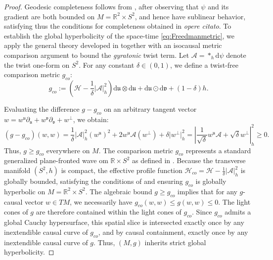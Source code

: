 \documentclass[10pt,a4paper,twoside,reqno]{amsart}
\theoremstyle{plain}
\theoremstyle{definition}
\theoremstyle{remark}
\def\dd{\mathrm{d}}
\def\cH{\mathcal{H}}
\def\cH{\mathcal{H}}
\def\dd{\mathrm{d}}
\def\fru{\mathfrak{u}}
\def\frv{\mathfrak{v}}
\begin{document}
\begin{proof}
Geodesic completeness follows from \cite{Candela:2002rr,Samann:2016svf}, after observing that $\psi$ and its gradient are both bounded on $M = \mathbb{R}^2 \times S^2$, and hence have sublinear behavior, satisfying thus the conditions for completeness obtained in \emph{opere citato}. To establish the global hyperbolicity of the space-time \eqref{eq:Freedmanmetric}, we apply the general theory developed in \cite{Flores:2002fx} together with an isocausal metric comparison argument to bound the \emph{gyratonic} twist term. Let $\mathcal{A} = \ast_h \dd\psi$ denote the twist one-form on $S^2$. For any constant $\delta \in (0,1)$, we define a twist-free comparison metric $g_{co}$:
\begin{equation*}
g_{co} :=  (\cH - \frac{1}{\delta} \vert\mathcal{A}\vert^2_h ) \dd\fru \otimes \dd\fru + \dd\fru \odot \dd\frv + (1-\delta) h.
\end{equation*}

\noindent
Evaluating the difference $g - g_{co}$ on an arbitrary tangent vector $w = w^\fru \partial_\fru + w^\frv \partial_\frv + w^\perp$, we obtain:
\begin{equation*}
(g - g_{co})(w,w) = \frac{1}{\delta} \vert\mathcal{A}\vert^2_h (w^\fru)^2 + 2 w^\fru \mathcal{A}(w^\perp) + \delta \vert w^\perp \vert^2_h = \left\vert \frac{1}{\sqrt{\delta}} w^\fru \mathcal{A} + \sqrt{\delta} w^\perp \right\vert^2_h \ge 0.
\end{equation*}
Thus, $g \ge g_{co}$ everywhere on $M$. The comparison metric $g_{co}$ represents a standard generalized plane-fronted wave om $\mathbb{R}\times S^2$ as defined in \cite{Flores:2002fx}. Because the transverse manifold $(S^2, h)$ is compact, the effective profile function $\cH_{co} = \cH - \frac{1}{\delta} \vert\mathcal{A}\vert^2_h$ is globally bounded, satisfying the conditions of \cite{Flores:2002fx} and ensuring $g_{co}$ is globally hyperbolic on $M = \mathbb{R}^2 \times S^2$. The algebraic bound $g \ge g_{co}$ implies that for any $g$-causal vector $w \in TM$, we necessarily have $g_{co}(w,w) \le g(w,w) \le 0$. The light cones of $g$ are therefore contained within the light cones of $g_{co}$. Since $g_{co}$ admits a global Cauchy hypersurface, this spatial slice is intersected exactly once by any inextendible causal curve of $g_{co}$, and by causal containment, exactly once by any inextendible causal curve of $g$. Thus, $(M,g)$ inherits strict global hyperbolicity.
\end{proof}
\end{document}
